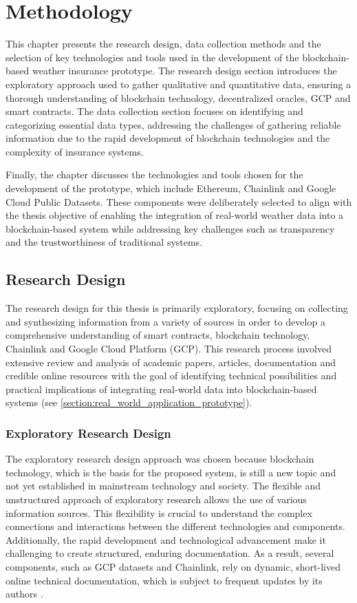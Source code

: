 \chapter{Methodology}\label{chapter:methodology}
This chapter presents the research design, data collection methods and the selection of key technologies and tools used in the development of the blockchain-based weather insurance prototype. The research design section introduces the exploratory approach used to gather qualitative and quantitative data, ensuring a thorough understanding of blockchain technology, decentralized oracles, GCP and smart contracts. The data collection section focuses on identifying and categorizing essential data types, addressing the challenges of gathering reliable information due to the rapid development of blockchain technologies and the complexity of insurance systems.

Finally, the chapter discusses the technologies and tools chosen for the development of the prototype, which include Ethereum, Chainlink and Google Cloud Public Datasets. These components were deliberately selected to align with the thesis objective of enabling the integration of real-world weather data into a blockchain-based system while addressing key challenges such as transparency and the trustworthiness of traditional systems.

\section{Research Design}\label{section:research_design}
The research design for this thesis is primarily exploratory, focusing on collecting and synthesizing information from a variety of sources in order to develop a comprehensive understanding of smart contracts, blockchain technology, Chainlink and Google Cloud Platform (GCP). This research process involved extensive review and analysis of academic papers, articles, documentation and credible online resources with the goal of identifying technical possibilities and practical implications of integrating real-world data into blockchain-based systems (see \cref{section:real_world_application_prototype}).

\subsection{Exploratory Research Design}
The exploratory research design approach was chosen because blockchain technology, which is the basis for the proposed system, is still a new topic and not yet established in mainstream technology and society. The flexible and unstructured approach of exploratory research allows the use of various information sources. This flexibility is crucial to understand the complex connections and interactions between the different technologies and components. Additionally, the rapid development and technological advancement make it challenging to create structured, enduring documentation. As a result, several components, such as GCP datasets and Chainlink, rely on dynamic, short-lived online technical documentation, which is subject to frequent updates by its authors \autocite{kicsi2022exploratory}.

